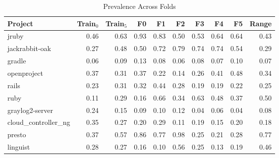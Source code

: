 \begin{table}[htbp]
\centering
\small
\caption{Prevalence Across Folds}
\label{tab:drift}
\begin{tabular}{lrrrrrrrrr}
\toprule
Project & Train$_0$ & Train$_5$ & F0 & F1 & F2 & F3 & F4 & F5 & Range \\
\midrule
jruby & 0.46 & 0.63 & 0.93 & 0.83 & 0.50 & 0.53 & 0.64 & 0.64 & 0.43 \\
jackrabbit-oak & 0.27 & 0.48 & 0.50 & 0.72 & 0.79 & 0.74 & 0.74 & 0.54 & 0.29 \\
gradle & 0.06 & 0.09 & 0.13 & 0.08 & 0.06 & 0.08 & 0.07 & 0.10 & 0.07 \\
openproject & 0.37 & 0.31 & 0.37 & 0.22 & 0.14 & 0.26 & 0.41 & 0.48 & 0.34 \\
rails & 0.23 & 0.31 & 0.32 & 0.44 & 0.28 & 0.19 & 0.19 & 0.22 & 0.25 \\
ruby & 0.11 & 0.29 & 0.16 & 0.66 & 0.34 & 0.63 & 0.48 & 0.37 & 0.50 \\
graylog2-server & 0.24 & 0.15 & 0.09 & 0.10 & 0.12 & 0.04 & 0.06 & 0.04 & 0.08 \\
cloud\_controller\_ng & 0.35 & 0.27 & 0.20 & 0.29 & 0.11 & 0.19 & 0.15 & 0.20 & 0.18 \\
presto & 0.37 & 0.57 & 0.86 & 0.77 & 0.98 & 0.25 & 0.21 & 0.28 & 0.77 \\
linguist & 0.28 & 0.27 & 0.16 & 0.10 & 0.56 & 0.25 & 0.13 & 0.19 & 0.46 \\
\bottomrule
\end{tabular}
\end{table}
